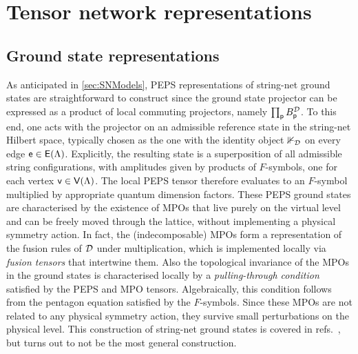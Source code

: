 \section{Tensor network representations}\label{sec:SNPEPS}
\subsection{Ground state representations}
As anticipated in \cref{sec:SNModels}, PEPS representations of string-net ground states are straightforward to construct since the ground state projector can be expressed as a product of local commuting projectors, namely $\prod_{\mathsf{p}} B_{\mathsf{p}}^{\mathcal{D}}$. To this end, one acts with the projector on an admissible reference state in the string-net Hilbert space, typically chosen as the one with the identity object $\mathbb 1_{\mathcal{D}}$ on every edge $\mathsf{e}\in\mathsf{E}(\Lambda)$. Explicitly, the resulting state is a superposition of all admissible string configurations, with amplitudes given by products of $F$-symbols, one for each vertex $\mathsf{v}\in\mathsf{V}(\Lambda)$. The local PEPS tensor therefore evaluates to an $F$-symbol multiplied by appropriate quantum dimension factors. These PEPS ground states are characterised by the existence of MPOs that live purely on the virtual level and can be freely moved through the lattice, without implementing a physical symmetry action. In fact, the (indecomposable) MPOs form a representation of the fusion rules of $\mathcal{D}$ under multiplication, which is implemented locally via \emph{fusion tensors} that intertwine them. Also the topological invariance of the MPOs in the ground states is characterised locally by a \emph{pulling-through condition} satisfied by the PEPS and MPO tensors. Algebraically, this condition follows from the pentagon equation satisfied by the $F$-symbols. Since these MPOs are not related to any physical symmetry action, they survive small perturbations on the physical level. This construction of string-net ground states is covered in refs.~\cite{Gu2009,Buerschaper2009,Williamson2017}, but turns out to not be the most general construction.

